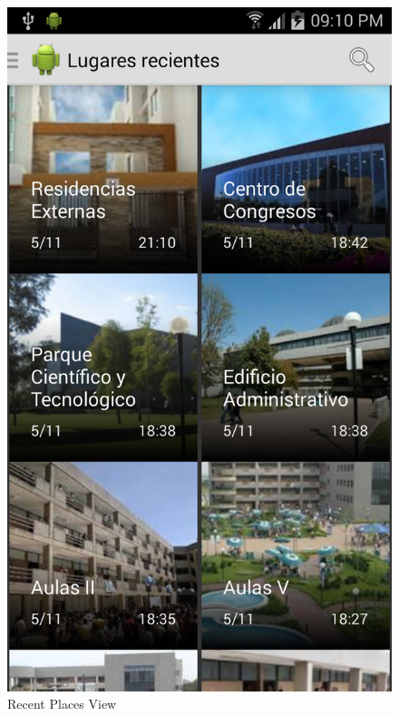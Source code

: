 \begin{figure}[ht]
  \centering
  \includegraphics[scale=0.08]{travelex_places}
  \caption{Recent Places View}
  \label{fig_places}
\end{figure}

